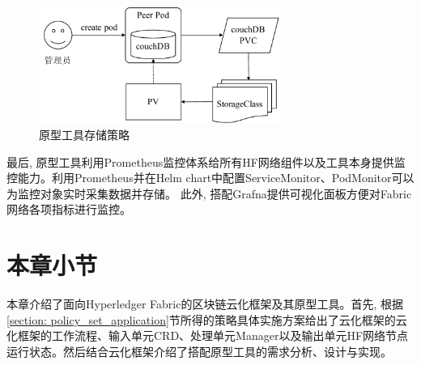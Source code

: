 \begin{figure}[h] %
    \centering %
    \includegraphics[width=0.7\textwidth]{FIGs/chapter4/pvc_sc.pdf} %
    \caption{原型工具存储策略} %
    \label{pvc_sc} %
\end{figure}%

最后, 原型工具利用Prometheus监控体系给所有HF网络组件以及工具本身提供监控能力。利用Prometheus并在Helm chart中配置ServiceMonitor、PodMonitor可以为监控对象实时采集数据并存储。 此外, 搭配Grafna提供可视化面板方便对Fabric网络各项指标进行监控。

\section{本章小节}

本章介绍了面向Hyperledger Fabric的区块链云化框架及其原型工具。首先, 根据\ref{section: policy_set_application}节所得的策略具体实施方案给出了云化框架的云化框架的工作流程、输入单元CRD、处理单元Manager以及输出单元HF网络节点运行状态。然后结合云化框架介绍了搭配原型工具的需求分析、设计与实现。






